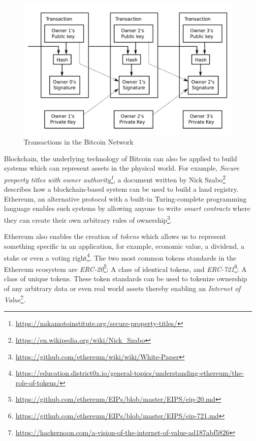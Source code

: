 	\begin{figure}[h]
		\includegraphics[width=\linewidth]{figures/bitcoin-transactions}
		\caption{\label{fig:bitcoin-transactions} Transactions in the Bitcoin Network\protect\footnotemark}
	\end{figure}
	
	Blockchain, the underlying technology of Bitcoin can also be applied to build systems which can represent assets in the physical world. For example, \textit{Secure property titles with owner authority\footnote{\url{https://nakamotoinstitute.org/secure-property-titles/}}}, a document written by Nick Szabo\footnote{\url{https://en.wikipedia.org/wiki/Nick_Szabo}} describes how a blockchain-based system can be used to build a land registry. Ethereum\cite{buterin2014ethereum}, an alternative protocol with a built-in Turing-complete programming language enables such systems by allowing anyone to write \textit{smart contracts}\cite{szabo1997formalizing} where they can create their own arbitrary rules of ownership\footnote{\url{https://github.com/ethereum/wiki/wiki/White-Paper}}.
	
	Ethereum also enables the creation of \textit{tokens} which allows us to represent something specific in an application, for example, economic value, a dividend, a stake or even a voting right\footnote{\url{https://education.district0x.io/general-topics/understanding-ethereum/the-role-of-tokens/}}. The two most common tokens standards in the Ethereum ecosystem are \textit{ERC-20}\footnote{\url{https://github.com/ethereum/EIPs/blob/master/EIPS/eip-20.md}}: A class of identical tokens, and \textit{ERC-721}\footnote{\url{https://github.com/ethereum/EIPs/blob/master/EIPS/eip-721.md}}: A class of unique tokens. These token standards can be used to tokenize ownership of any arbitrary data or even real world assets thereby enabling an \textit{Internet of Value}\footnote{\url{https://hackernoon.com/a-vision-of-the-internet-of-value-ad187abf5826}}.
	
